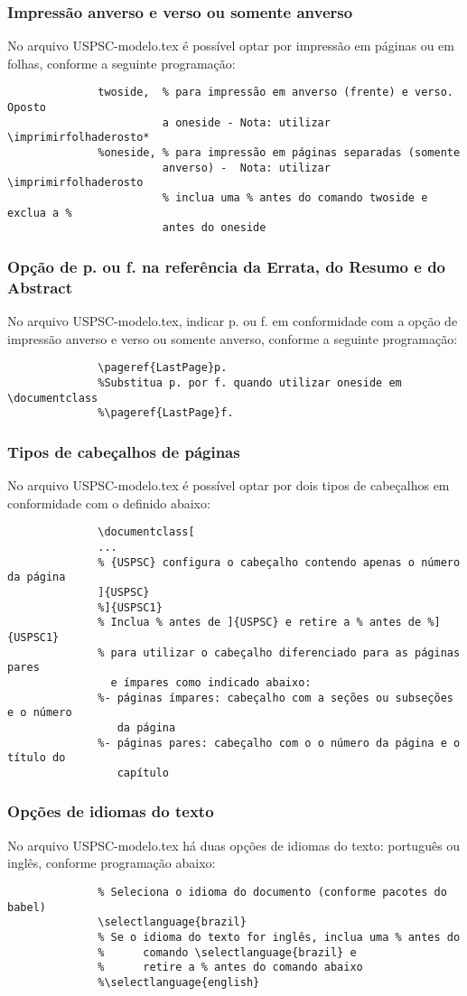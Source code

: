 \subsubsection{Impressão anverso e verso ou somente anverso}
No arquivo USPSC-modelo.tex é possível optar por impressão em páginas ou em folhas, conforme a seguinte programação:
			  \begin{verbatim}
			  twoside,  % para impressão em anverso (frente) e verso. Oposto 
			            a oneside - Nota: utilizar \imprimirfolhaderosto*
			  %oneside, % para impressão em páginas separadas (somente 
			            anverso) -  Nota: utilizar \imprimirfolhaderosto
			            % inclua uma % antes do comando twoside e exclua a % 
			            antes do oneside 
			  \end{verbatim}			  
\subsubsection{Opção de p. ou f. na referência da Errata, do Resumo e do Abstract} 
 No arquivo USPSC-modelo.tex, indicar p. ou f. em conformidade com a opção de impressão anverso e verso ou somente anverso, conforme a seguinte programação:
			  \begin{verbatim}
			  \pageref{LastPage}p. 
			  %Substitua p. por f. quando utilizar oneside em \documentclass
			  %\pageref{LastPage}f.
			  \end{verbatim}			  
\subsubsection{Tipos de cabeçalhos de páginas} 
No arquivo USPSC-modelo.tex é possível optar por dois tipos de cabeçalhos em conformidade com o definido abaixo:
			  \begin{verbatim}
			  \documentclass[
			  ...
			  % {USPSC} configura o cabeçalho contendo apenas o número da página
			  ]{USPSC}
			  %]{USPSC1}
			  % Inclua % antes de ]{USPSC} e retire a % antes de %]{USPSC1}
			  % para utilizar o cabeçalho diferenciado para as páginas pares 
			    e ímpares como indicado abaixo:
			  %- páginas ímpares: cabeçalho com a seções ou subseções e o número 
			     da página
			  %- páginas pares: cabeçalho com o o número da página e o título do 
			     capítulo 
			  \end{verbatim}
\subsubsection{Opções de idiomas do texto} 
No arquivo USPSC-modelo.tex há duas opções de idiomas do texto: português ou inglês, conforme programação abaixo:			  
			  \begin{verbatim}
			  % Seleciona o idioma do documento (conforme pacotes do babel)
			  \selectlanguage{brazil}
			  % Se o idioma do texto for inglês, inclua uma % antes do 
			  %      comando \selectlanguage{brazil} e 
			  %      retire a % antes do comando abaixo
			  %\selectlanguage{english}			  
			  \end{verbatim}
